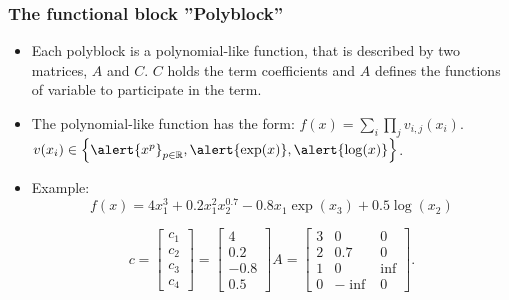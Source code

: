 \documentclass[mathserif]{beamer}
\begin{document}
\begin{frame}
\frametitle{The functional block ''Polyblock''}
\begin{itemize}
\item Each polyblock is a polynomial-like function, that is described by two matrices, $A$ and $C$. $C$ holds the
 term coefficients and $A$ defines the functions of variable to participate in
 the term.
\item  The polynomial-like function has the form: $f(x)=\sum_i \prod_j
v_{i,j}(x_i)$.  $v(x_i) \in \left \{ \alert{x^p} _{ p \in \mathbb R}, \alert{ \exp(x)} ,
\alert{\log(x)} \right \}$.
\item Example:
\begin{equation*}
f(x) = 4 x_1^3 + 0.2 x_1^2 x_2^{0.7} - 0.8 x_1 \exp(x_3) + 0.5 \log( x_2)
\label{eq:example_poly}
\end{equation*}

\begin{equation*}
c = \left[\begin{array}{c} c_1 \\ c_2 \\ c_3 \\ c_4 \end{array}\right] 
= \left[\begin{array}{c} 4 \\ 0.2 \\ -0.8 \\ 0.5 \end{array}\right] 
A = \left[\begin{array}{ccc} 3 & 0 & 0  \\ 2 & 0.7 & 0  \\ 1 & 0 & \inf  \\ 0 & -\inf & 0    \end{array}\right].
\label{eq:example_sparserep}
\end{equation*}
\end{itemize}
\end{frame}
\end{document}
